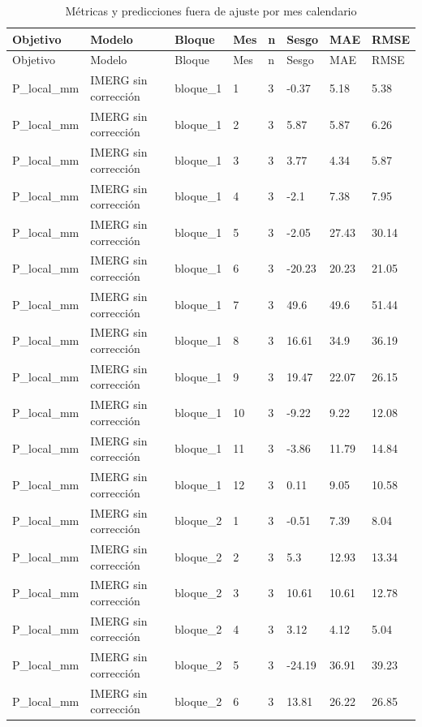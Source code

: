 \begin{longtable}{llllllll}
\caption{Métricas y predicciones fuera de ajuste por mes calendario}\\
\toprule
Objetivo & Modelo & Bloque & Mes & n & Sesgo & MAE & RMSE \\
\midrule
\endfirsthead
\toprule
Objetivo & Modelo & Bloque & Mes & n & Sesgo & MAE & RMSE \\
\midrule
\endhead
\bottomrule
\endfoot
P\_local\_mm & IMERG sin corrección & bloque\_1 & 1 & 3 & -0.37 & 5.18 & 5.38 \\
P\_local\_mm & IMERG sin corrección & bloque\_1 & 2 & 3 & 5.87 & 5.87 & 6.26 \\
P\_local\_mm & IMERG sin corrección & bloque\_1 & 3 & 3 & 3.77 & 4.34 & 5.87 \\
P\_local\_mm & IMERG sin corrección & bloque\_1 & 4 & 3 & -2.1 & 7.38 & 7.95 \\
P\_local\_mm & IMERG sin corrección & bloque\_1 & 5 & 3 & -2.05 & 27.43 & 30.14 \\
P\_local\_mm & IMERG sin corrección & bloque\_1 & 6 & 3 & -20.23 & 20.23 & 21.05 \\
P\_local\_mm & IMERG sin corrección & bloque\_1 & 7 & 3 & 49.6 & 49.6 & 51.44 \\
P\_local\_mm & IMERG sin corrección & bloque\_1 & 8 & 3 & 16.61 & 34.9 & 36.19 \\
P\_local\_mm & IMERG sin corrección & bloque\_1 & 9 & 3 & 19.47 & 22.07 & 26.15 \\
P\_local\_mm & IMERG sin corrección & bloque\_1 & 10 & 3 & -9.22 & 9.22 & 12.08 \\
P\_local\_mm & IMERG sin corrección & bloque\_1 & 11 & 3 & -3.86 & 11.79 & 14.84 \\
P\_local\_mm & IMERG sin corrección & bloque\_1 & 12 & 3 & 0.11 & 9.05 & 10.58 \\
P\_local\_mm & IMERG sin corrección & bloque\_2 & 1 & 3 & -0.51 & 7.39 & 8.04 \\
P\_local\_mm & IMERG sin corrección & bloque\_2 & 2 & 3 & 5.3 & 12.93 & 13.34 \\
P\_local\_mm & IMERG sin corrección & bloque\_2 & 3 & 3 & 10.61 & 10.61 & 12.78 \\
P\_local\_mm & IMERG sin corrección & bloque\_2 & 4 & 3 & 3.12 & 4.12 & 5.04 \\
P\_local\_mm & IMERG sin corrección & bloque\_2 & 5 & 3 & -24.19 & 36.91 & 39.23 \\
P\_local\_mm & IMERG sin corrección & bloque\_2 & 6 & 3 & 13.81 & 26.22 & 26.85 \\

\end{longtable}
